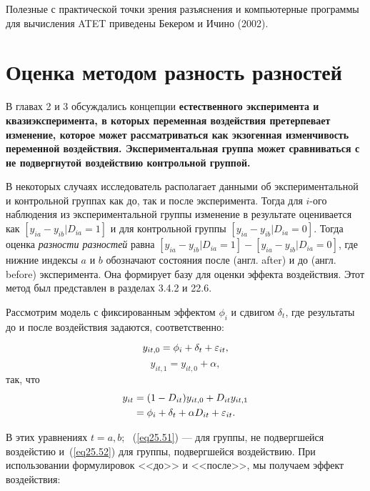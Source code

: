 Полезные с практической точки зрения разъяснения и  компьютерные программы для вычисления ATET приведены Бекером и Ичино (2002).

\section{Оценка методом разность разностей}

В главах 2 и 3 обсуждались концепции \bfseries естественного эксперимента \mdseries и \bfseries квазиэксперимента, \mdseries в которых переменная воздействия претерпевает изменение, которое может рассматриваться как экзогенная изменчивость переменной воздействия. Экспериментальная группа может сравниваться с не подвергнутой воздействию контрольной группой. 

В некоторых случаях исследователь располагает данными об экспериментальной и контрольной группах как до, так и после эксперимента. Тогда для $i$-ого наблюдения из экспериментальной группы изменение в результате оценивается как $[y_{ia} - y_{ib} | D_{ia} = 1]$ и для контрольной группы $[y_{ia} - y_{ib} | D_{ia} = 0]$. Тогда оценка {\it{разности разностей}} равна $[y_{ia} - y_{ib} | D_{ia} = 1] - [y_{ia} - y_{ib} | D_{ia} = 0]$, где нижние индексы $a$ и $b$ обозначают состояния после (англ. after) и до (англ. before) эксперимента. Она формирует базу для оценки эффекта воздействия. Этот метод был представлен в разделах 3.4.2 и 22.6. 

Рассмотрим модель с фиксированным эффектом $\phi_i$ и сдвигом $\delta_t$, где результаты до и после воздействия задаются, соответственно:

\begin{equation}
\label{eq25.51}
y_{it,0}= \phi_i + \delta_t + \varepsilon_{it}, 
\end{equation}
\begin{equation}
\label{eq25.52}
y_{it,1}= y_{it,0} + \alpha, 
\end{equation}
так, что 
\begin{align}
\label{eq25.53}
y_{it} & = (1 - D_{it}) y_{it,0} + D_{it} y_{it, 1} \\
&  =  \phi_i + \delta_t + \alpha D_{it} + \varepsilon_{it}. \nonumber 
\end{align}

В этих уравнениях $t = a, b$; ~(\ref{eq25.51}) --- для группы, не подвергшейся воздейстию и~(\ref{eq25.52}) для группы, подвергшейся воздействию. При использовании формулировок <<до>> и <<после>>, мы получаем эффект воздействия:

